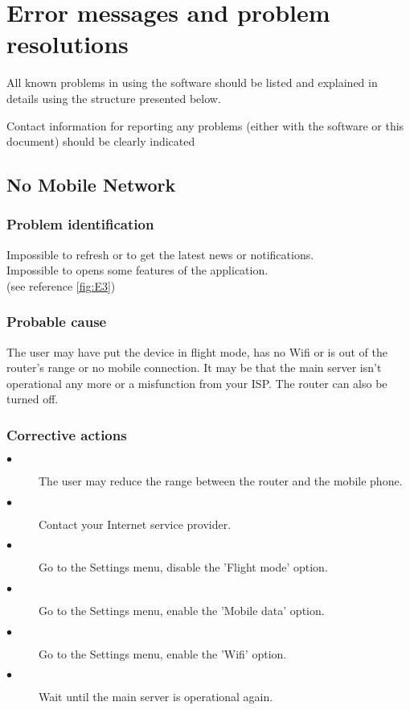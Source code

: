 
\chapter{Error messages and problem resolutions}
\label{chap:error_messages}

All known problems in using the software should be listed and explained in
details using the structure presented below.

Contact information for reporting any problems (either with the software or
this document) should be clearly indicated


\section{No Mobile Network}

\subsection{Problem identification}
Impossible to refresh or to get the latest news or notifications.\\
Impossible to opens some features of the application.\\
(see reference \ref{fig:E3})\\

\subsection{Probable cause}
The user may have put the device in flight mode, has no Wifi or is out of the
router's range or no mobile connection. It may be that the main server isn't
operational any more or a misfunction from your ISP. The router can also be
turned off.

\subsection{Corrective actions}
\begin{description} 
\item[$\bullet$] The user may reduce the range between the router and the mobile
phone.
\item[$\bullet$] Contact your Internet service provider.
\item[$\bullet$] Go to the Settings menu, disable the 'Flight mode' option.
\item[$\bullet$] Go to the Settings menu, enable the 'Mobile data' option.
\item[$\bullet$] Go to the Settings menu, enable the 'Wifi' option.
\item[$\bullet$] Wait until the main server is operational again.
\end{description} 

